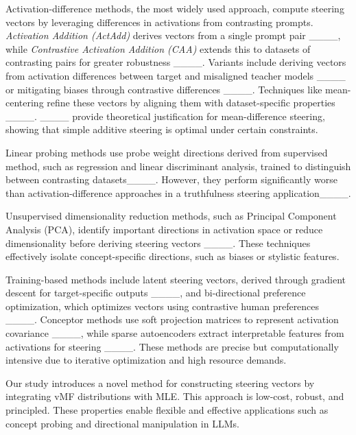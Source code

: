 Activation-difference methods, the most widely used approach, compute steering vectors by leveraging differences in activations from contrasting prompts. \textit{Activation Addition (ActAdd)} derives vectors from a single prompt pair ____, while \textit{Contrastive Activation Addition (CAA)} extends this to datasets of contrasting pairs for greater robustness ____. Variants include deriving vectors from activation differences between target and misaligned teacher models ____ or mitigating biases through contrastive differences ____. Techniques like mean-centering refine these vectors by aligning them with dataset-specific properties ____. ____ provide theoretical justification for mean-difference steering, showing that simple additive steering is optimal under certain constraints. 

Linear probing methods use probe weight directions derived from supervised method, such as regression and linear discriminant analysis, trained to distinguish between contrasting datasets____. However, they perform significantly worse than activation-difference approaches in a truthfulness steering application____. 

Unsupervised dimensionality reduction methods, such as Principal Component Analysis (PCA), identify important directions in activation space or reduce dimensionality before deriving steering vectors ____. These techniques effectively isolate concept-specific directions, such as biases or stylistic features.



Training-based methods include latent steering vectors, derived through gradient descent for target-specific outputs ____, and bi-directional preference optimization, which optimizes vectors using contrastive human preferences ____. Conceptor methods use soft projection matrices to represent activation covariance ____, while sparse autoencoders extract interpretable features from activations for steering ____. These methods are precise but computationally intensive due to iterative optimization and high resource demands.



Our study introduces a novel method for constructing steering vectors by integrating vMF distributions with MLE. This approach is low-cost, robust, and principled. These properties enable flexible and effective applications such as concept probing and directional manipulation in LLMs.